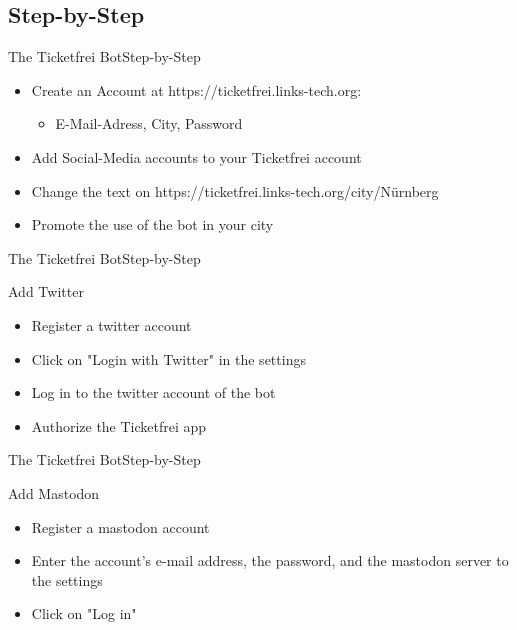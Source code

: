 \documentclass[10pt]{beamer}
\begin{document}
{\subsection{Step-by-Step}
\begin{frame}{The Ticketfrei Bot}{Step-by-Step}

\begin{itemize}
  \item Create an Account at https://ticketfrei.links-tech.org:
  \begin{itemize}
    \item E-Mail-Adress, City, Password
  \end{itemize}
  \item Add Social-Media accounts to your Ticketfrei account
  \item Change the text on https://ticketfrei.links-tech.org/city/Nürnberg
  \item Promote the use of the bot in your city
\end{itemize}

\end{frame}
\begin{frame}{The Ticketfrei Bot}{Step-by-Step}

\begin{block}{{Add Twitter}}
  \begin{itemize}
    \item Register a twitter account
    \item Click on "Login with Twitter" in the settings
    \item Log in to the twitter account of the bot
    \item Authorize the Ticketfrei app
  \end{itemize}
\end{block}

\end{frame}
\begin{frame}{The Ticketfrei Bot}{Step-by-Step}

\begin{block}{{Add Mastodon}}
  \begin{itemize}
    \item Register a mastodon account
    \item Enter the account's e-mail address, the password, and the mastodon server to the settings
    \item Click on "Log in"
  \end{itemize}
\end{block}


\end{frame}}
\end{document}
